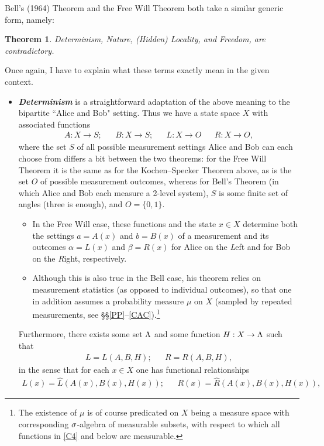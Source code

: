 \documentclass[12pt]{article}
\numberwithin{equation}{section}
\newcommand{\hi}[1]{\emph{\textbf{#1}}}
\newcommand{\er}{\eqref}
\newcommand{\raw}{\rightarrow}
\newcommand{\al}{\alpha} \newcommand{\bt}{L\beta}
\newtheorem{theorem}[definition]{Theorem}
\begin{document}
\noindent Bell's (1964) Theorem and the Free Will Theorem both take a similar generic form, namely:
    \begin{theorem}\label{FWTthm}
Determinism, Nature, (Hidden) Locality, and Freedom,   are contradictory.
\end{theorem}
Once again, I have to explain what these terms exactly mean in the given context. 
\begin{itemize}
\item \hi{Determinism} is a straightforward adaptation of the above meaning to the bipartite ``Alice and Bob" setting. Thus we have a state space $X$  with associated functions 
\begin{align}
A: X\raw S; & &
B: X\raw S; &&
 L:X\raw O & &
 R: X\raw O, \label{C4}
\end{align}
where the set $S$ of all possible measurement settings Alice and Bob can each choose from differs a bit between the two theorems:
for the Free Will Theorem it is the same as for the Kochen--Specker Theorem above, as is the set  $O$ of possible measurement outcomes, 
whereas for Bell's Theorem (in which Alice and Bob each measure a 2-level system), $S$ is some finite set of angles (three is enough), and 
 $O=\{0,1\}$.
 \begin{itemize}
\item In the Free Will case, these functions and the state $x\in X$ determine both the settings $a=A(x)$ and $b=B(x)$ of a measurement  and its outcomes  $\al=L(x)$ and $\beta=R(x)$ for Alice on the \emph{L}eft and for Bob on the \emph{R}ight, respectively.
\item  Although this is also true in the Bell case,  his theorem relies on measurement statistics (as opposed to individual outcomes), so that one in addition assumes a probability measure $\mu$ on $X$ (sampled by repeated measurements, see \S\S\ref{PP}--\ref{CAC}).\footnote{The existence of $\mu$ is of course predicated on $X$ being a measure space with corresponding $\sigma$-algebra of measurable subsets, with respect to which all functions in \er{C4} and below are measurable.}
\end{itemize}
Furthermore, there exists some set $\Lambda$ and some  function  $H:X\raw \Lm$ such that
 \begin{align}
 L=L(A,B,H); &&
 R=R(A,B,H),
\end{align}
 in the sense that for each $x\in X$ one has  functional relationships
 \begin{align}
 L(x)=\hat{L}(A(x),B(x),H(x)); &&
 R(x)=\hat{R}(A(x),B(x),H(x)),\label{GhatG}

\end{align}
\end{itemize}
\end{document}
